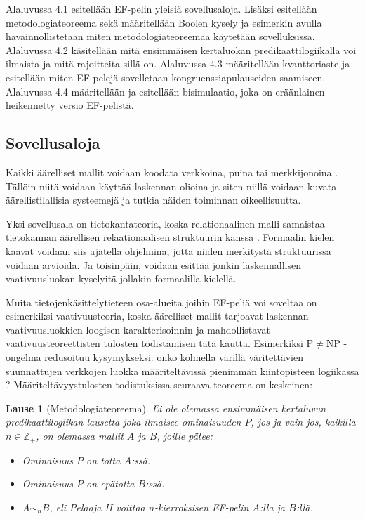 \documentclass[finnish]{tktltiki2}
\newtheorem{lau}{Lause}
\theoremstyle{definition}
\theoremstyle{remark}
\begin{document}
Alaluvussa 4.1 esitellään EF-pelin yleisiä sovellusaloja. Lisäksi esitellään metodologiateoreema sekä määritellään Boolen kysely ja esimerkin avulla havainnollistetaan miten metodologiateoreemaa käytetään sovelluksissa. Alaluvussa 4.2 käsitellään mitä ensimmäisen kertaluokan predikaattilogiikalla voi ilmaista ja mitä rajoitteita sillä on. Alaluvussa 4.3 määritellään kvanttoriaste ja esitellään miten EF-pelejä sovelletaan kongruenssiapulauseiden saamiseen. Alaluvussa 4.4 määritellään ja esitellään bisimulaatio, joka on eräänlainen heikennetty versio EF-pelistä.

\subsection{Sovellusaloja}
Kaikki äärelliset mallit voidaan koodata verkkoina, puina tai merkkijonoina \cite{Ebb99}. Tällöin niitä voidaan käyttää laskennan olioina ja siten niillä voidaan kuvata äärellistilallisia systeemejä ja tutkia näiden toiminnan oikeellisuutta. 

Yksi sovellusala on tietokantateoria, koska relationaalinen malli samaistaa tietokannan äärellisen relaationaalisen struktuurin kanssa \cite{Luo10}. Formaalin kielen kaavat voidaan siis ajatella ohjelmina, jotta niiden merkitystä struktuurissa voidaan arvioida. Ja toisinpäin, voidaan esittää jonkin laskennallisen vaativuusluokan kyselyitä jollakin formaalilla kielellä.

Muita tietojenkäsittelytieteen osa-alueita joihin EF-peliä voi soveltaa on esimerkiksi vaativuusteoria, koska äärelliset mallit tarjoavat laskennan vaativuusluokkien loogisen karakterisoinnin ja mahdollistavat vaativuusteoreettisten tulosten todistamisen tätä kautta. Esimerkiksi $\mathrm{P} \neq \mathrm{NP}$ -ongelma redusoituu kysymykseksi: onko kolmella värillä väritettävien suunnattujen verkkojen luokka määriteltävissä pienimmän kiintopisteen logiikassa \cite{Imm86}? Määriteltävyystulosten todistuksissa seuraava teoreema on keskeinen:

\begin{lau}[Metodologiateoreema]
Ei ole olemassa ensimmäisen kertaluvun predikaattilogiikan lausetta joka ilmaisee ominaisuuden $P$, jos ja vain jos, kaikilla $n \in \mathbb{Z}_+$, on olemassa mallit $A$ ja $B$, joille pätee:
\begin{itemize}
\item Ominaisuus $P$ on totta $A$:ssä.
\item Ominaisuus $P$ on epätotta $B$:ssä.
\item $A \sim_n B$, eli Pelaaja II voittaa $n$-kierroksisen EF-pelin $A$:lla ja $B$:llä.
\end{itemize}
\end{lau}
\end{document}
